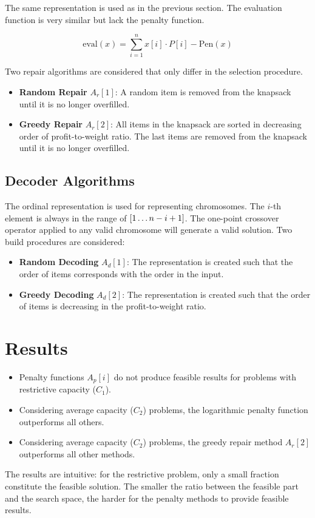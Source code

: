 \documentclass[../main.tex]{subfiles}
\begin{document}
The same representation is used as in the previous section. The evaluation function is very similar but lack the
penalty function.

\begin{equation}
\text{eval}(x) = \sum^n_{i=1} x[i] \cdot P[i] - \text{Pen}(x)
\end{equation}

Two repair algorithms are considered that only differ in the selection procedure.

\begin{itemize}
	\item \textbf{Random Repair} $A_r[1]$: A random item is removed from the knapsack until it is no longer overfilled.
	\item \textbf{Greedy Repair} $A_r[2]$: All items in the knapsack are sorted in decreasing order of profit-to-weight
	ratio. The last items are removed from the knapsack until it is no longer overfilled.
\end{itemize}

\subsection{Decoder Algorithms}

The ordinal representation is used for representing chromosomes. The $i$-th element is always in the range of $[1
\mathellipsis n - i + 1]$. The one-point crossover operator applied to any valid chromosome will generate a valid
solution. Two build procedures are considered:

\begin{itemize}
	\item \textbf{Random Decoding} $A_d[1]$: The representation is created such that the order of items corresponds
	with the order in the input.
	\item \textbf{Greedy Decoding} $A_d[2]$: The representation is created such that the order of items is decreasing
	in the profit-to-weight ratio.
\end{itemize}

\section{Results}

\begin{itemize}
	\item Penalty functions $A_p[i]$ do not produce feasible results for problems with restrictive capacity ($C_1$).
	\item Considering average capacity ($C_2$) problems, the logarithmic penalty function outperforms all others.
	\item Considering average capacity ($C_2$) problems, the greedy repair method $A_r[2]$ outperforms all other
	methods.
\end{itemize}

The results are intuitive: for the restrictive problem, only a small fraction constitute the feasible solution. The
smaller the ratio between the feasible part and the search space, the harder for the penalty methods to provide
feasible results.
\end{document}
